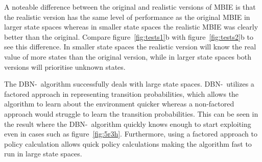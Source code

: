 A noteable difference between the original and realistic versions of MBIE is
that the realistic version has the same level of performance as the original
MBIE in larger state spaces whereas in smaller state spaces the realistic MBIE
was clearly better than the original. Compare figure~\ref{fig:tests1}b with
figure~\ref{fig:tests2}b to see this difference. In smaller state spaces the
realistic version will know the real value of more states than the original
version, while in larger state spaces both versions will prioritise unknown
states.

The DBN-\etre\ algorithm successfully deals with large state spaces. DBN-\etre\
utilizes a factored approach in representing transition probabilities, which
allows the algorithm to learn about the environment quicker whereas a
non-factored approach would struggle to learn the transition probabilities.
This can be seen in the result where the DBN-\etre\ algorithm quickly knows
enough to start exploiting even in cases such as figure~\ref{fig:5r3h}.
Furthermore, using a factored approach to policy calculation allows quick
policy calculations making the algorithm fast to run in large state spaces.
